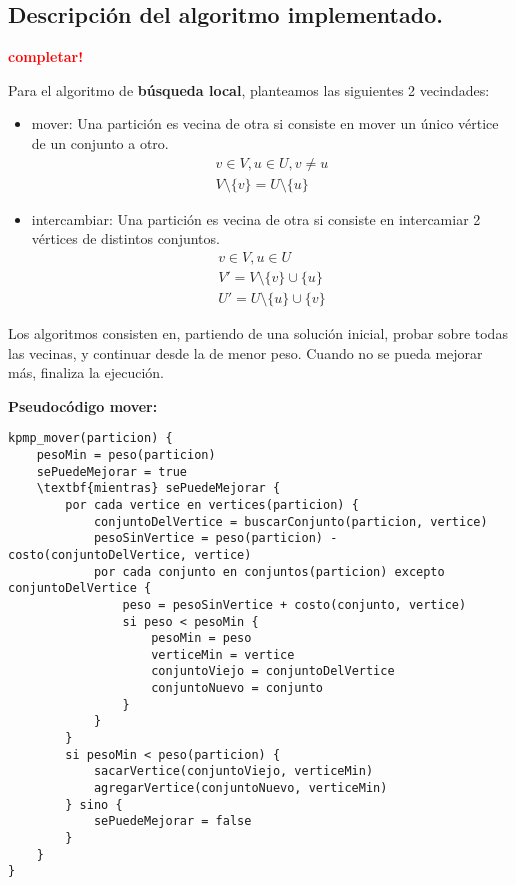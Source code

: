\subsection{Descripción del algoritmo implementado.}
\vspace*{0.3cm}
\textcolor{red}{\textbf{completar!}}

Para el algoritmo de \textbf{búsqueda local}, planteamos las siguientes 2 vecindades:

\begin{itemize}
    \item mover: Una partición es vecina de otra si consiste en mover un único vértice de un conjunto a otro.
    \begin{align*}
        v \in V, u \in U, v \ne u \\
        V \setminus \{v\} = U \setminus \{u\}
    \end{align*}

    \item intercambiar: Una partición es vecina de otra si consiste en intercamiar 2 vértices de distintos conjuntos.
    \begin{align*}
        v \in V, u \in U \\
        V' = V \setminus \{v\} \cup \{u\} \\
        U' = U \setminus \{u\} \cup \{v\}
    \end{align*}
\end{itemize}

Los algoritmos consisten en, partiendo de una solución inicial, probar sobre todas las vecinas, y continuar desde la de menor peso. Cuando no se pueda mejorar más, finaliza la ejecución.

\vspace*{0.5cm}

\textbf{Pseudocódigo mover:}

\vspace*{0.3cm}

\begin{verbatim}
kpmp_mover(particion) {
    pesoMin = peso(particion)
    sePuedeMejorar = true
    \textbf{mientras} sePuedeMejorar {
        por cada vertice en vertices(particion) {
            conjuntoDelVertice = buscarConjunto(particion, vertice)
            pesoSinVertice = peso(particion) - costo(conjuntoDelVertice, vertice)
            por cada conjunto en conjuntos(particion) excepto conjuntoDelVertice {
                peso = pesoSinVertice + costo(conjunto, vertice)
                si peso < pesoMin {
                    pesoMin = peso
                    verticeMin = vertice
                    conjuntoViejo = conjuntoDelVertice
                    conjuntoNuevo = conjunto
                }
            }
        }
        si pesoMin < peso(particion) {
            sacarVertice(conjuntoViejo, verticeMin)
            agregarVertice(conjuntoNuevo, verticeMin)
        } sino {
            sePuedeMejorar = false
        }
    }
}
\end{verbatim}

